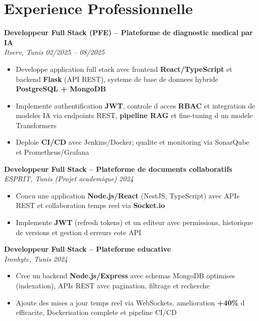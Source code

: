 \documentclass[10pt,a4paper]{article}
\begin{document}
\vspace{6pt}

\section*{Experience Professionnelle}
{\small

\textbf{Developpeur Full Stack (PFE) -- Plateforme de diagnostic medical par IA}\\[1pt]
\textit{Itserv, Tunis} \hfill \textit{02/2025 -- 08/2025}
\begin{itemize}
  \item Developpe application full stack avec frontend \textbf{React/TypeScript} et backend \textbf{Flask} (API REST), systeme de base de donnees hybride \textbf{PostgreSQL + MongoDB}
  \item Implemente authentification \textbf{JWT}, controle d acces \textbf{RBAC} et integration de modeles IA via endpoints REST, \textbf{pipeline RAG} et fine-tuning d un modele Transformers
  \item Deploie \textbf{CI/CD} avec Jenkins/Docker; qualite et monitoring via SonarQube et Prometheus/Grafana
\end{itemize}

\vspace{3pt}
\textbf{Developpeur Full Stack -- Plateforme de documents collaboratifs}\\[1pt]
\textit{ESPRIT, Tunis (Projet academique)} \hfill \textit{2024}
\begin{itemize}
  \item Concu une application \textbf{Node.js/React} (NestJS, TypeScript) avec APIs REST et collaboration temps reel via \textbf{Socket.io}
  \item Implemente \textbf{JWT} (refresh tokens) et un editeur avec permissions, historique de versions et gestion d erreurs cote API
\end{itemize}

\vspace{3pt}
\textbf{Developpeur Full Stack -- Plateforme educative}\\[1pt]
\textit{Ironbyte, Tunis} \hfill \textit{2024}
\begin{itemize}
  \item Cree un backend \textbf{Node.js/Express} avec schemas MongoDB optimises (indexation), APIs REST avec pagination, filtrage et recherche
  \item Ajoute des mises a jour temps reel via WebSockets, amelioration \textbf{+40\%} d efficacite, Dockerisation complete et pipeline CI/CD
\end{itemize}

}
\end{document}
